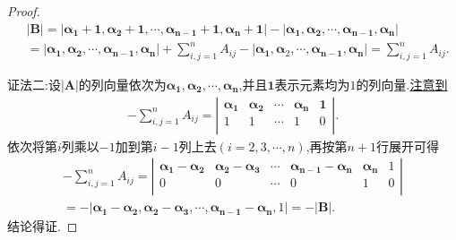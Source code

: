\documentclass[../../main.tex]{subfiles}
\begin{document}
\begin{proof}
\begin{align*}
&|\boldsymbol{B}| = |\boldsymbol{\alpha}_{\boldsymbol{1}} + \mathbf{1},\boldsymbol{\alpha}_{\boldsymbol{2}} + \mathbf{1},\cdots,\boldsymbol{\alpha}_{\boldsymbol{n-1}} + \mathbf{1},\boldsymbol{\alpha}_{\boldsymbol{n}} + \mathbf{1}| - |\boldsymbol{\alpha}_{\boldsymbol{1}},\boldsymbol{\alpha}_{\boldsymbol{2}},\cdots,\boldsymbol{\alpha}_{\boldsymbol{n-1}},\boldsymbol{\alpha}_{\boldsymbol{n}}|
\\
&= |\boldsymbol{\alpha}_{\boldsymbol{1}},\boldsymbol{\alpha}_{\boldsymbol{2}},\cdots,\boldsymbol{\alpha}_{\boldsymbol{n-1}},\boldsymbol{\alpha}_{\boldsymbol{n}}| + \sum_{i,j = 1}^{n}A_{ij} - |\boldsymbol{\alpha}_{\boldsymbol{1}},\boldsymbol{\alpha}_2,\cdots,\boldsymbol{\alpha}_{\boldsymbol{n-1}},\boldsymbol{\alpha}_{\boldsymbol{n}}| = \sum_{i,j = 1}^{n}A_{ij}.
\end{align*}

{\color{blue}证法二:}设\(|\boldsymbol{A}|\)的列向量依次为\(\boldsymbol{\alpha}_{\boldsymbol{1}},\boldsymbol{\alpha}_{\boldsymbol{2}},\cdots,\boldsymbol{\alpha}_{\boldsymbol{n}}\),并且\(\mathbf{1}\)表示元素均为\(1\)的列向量.\hyperref[关于行列式|A|所有代数余子式求和的构造]{注意到}
\begin{align*}
-\sum_{i,j=1}^n{A_{ij}}=\left| \begin{matrix}
\boldsymbol{\alpha }_{\mathbf{1}}&		\boldsymbol{\alpha }_{\mathbf{2}}&		\cdots&		\boldsymbol{\alpha }_{\boldsymbol{n}}&		\mathbf{1}\\
1&		1&		\cdots&		1&		0\\
\end{matrix} \right|.
\end{align*}
依次将第$i$列乘以$-1$加到第$i-1$列上去$(i=2,3,\cdots,n)$,再按第$n+1$行展开可得
\begin{align*}
-\sum_{i,j=1}^n{A_{ij}=\left| \begin{matrix}
\boldsymbol{\alpha }_{\mathbf{1}}-\boldsymbol{\alpha }_{\mathbf{2}}&		\boldsymbol{\alpha }_{\mathbf{2}}-\boldsymbol{\alpha }_{\mathbf{3}}&		\cdots&		\boldsymbol{\alpha }_{\boldsymbol{n}-\mathbf{1}}-\boldsymbol{\alpha }_{\boldsymbol{n}}&		\boldsymbol{\alpha }_{\boldsymbol{n}}&		1\\
0&		0&		\cdots&		0&		1&		0\\
\end{matrix} \right|}
\\
=-|\boldsymbol{\alpha }_{\mathbf{1}}-\boldsymbol{\alpha }_{\mathbf{2}},\boldsymbol{\alpha }_{\mathbf{2}}-\boldsymbol{\alpha }_{\mathbf{3}},\cdots ,\boldsymbol{\alpha }_{\boldsymbol{n}-\mathbf{1}}-\boldsymbol{\alpha }_{\boldsymbol{n}},1|=-|\boldsymbol{B}|.
\end{align*}
结论得证.
\end{proof}
\end{document}
